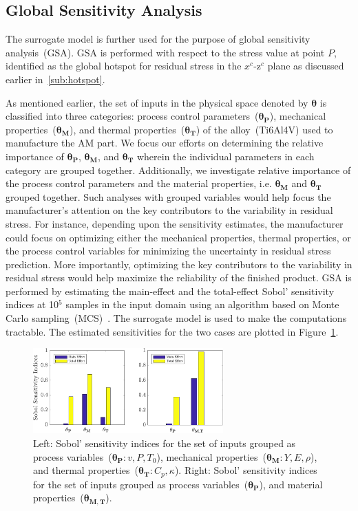 \subsection{Global Sensitivity Analysis}
\label{sub:gsa}

The surrogate model is further used for the purpose of global sensitivity analysis~(GSA). %
GSA is performed with respect to the stress value at point $P$, identified as the global hotspot
for residual stress in the $x^c$-z$^c$ plane as discussed earlier in~\ref{sub:hotspot}. 

As mentioned earlier, the set of inputs in the physical space denoted by $\bm{\theta}$ is classified into three
categories: process control parameters~($\bm{\theta_P}$), mechanical properties~($\bm{\theta_M}$), and
thermal properties~($\bm{\theta_T}$) of the alloy~(Ti6Al4V) used to manufacture the AM part. We focus
our efforts on determining the relative importance of $\bm{\theta_P}$, $\bm{\theta_M}$, and $\bm{\theta_T}$
wherein the individual parameters in each category are grouped together. Additionally, we investigate
relative importance of the process
control parameters and the material properties, i.e. $\bm{\theta_M}$ and $\bm{\theta_T}$ grouped together.
Such analyses with grouped variables would help focus the manufacturer's attention on the key
contributors to the variability in residual stress. For instance, depending upon the sensitivity estimates, the
manufacturer could focus on optimizing either the mechanical properties, thermal properties, or
the process control variables for minimizing the uncertainty in residual stress prediction. 
More importantly, optimizing the key contributors to the variability in residual stress would help maximize the reliability
of the finished product. 
 GSA is performed by estimating the main-effect and the total-effect Sobol' sensitivity
indices at 10$^5$ samples in the input domain using an algorithm based on 
Monte Carlo sampling~(MCS)~\cite{Sobol:2001}. The 
surrogate model is used to make the computations tractable. The estimated sensitivities for the two cases
are plotted in Figure~\ref{fig:gsa}.
%
\begin{figure}[htbp]
\begin{center}
\includegraphics[width=0.65\textwidth]{./Figures/grouped_GSA}
\end{center}
\caption{Left: Sobol' sensitivity indices for the set of inputs grouped as process variables~($\bm{\theta_P}:v,P,T_0$), 
mechanical properties~($\bm{\theta_M}:Y,E,\rho$), and thermal properties~($\bm{\theta_T}:C_p,\kappa$).
Right: Sobol' sensitivity indices for the set of inputs grouped as process variables~($\bm{\theta_P}$), and material 
properties~($\bm{\theta_{M,T}}$).}
\label{fig:gsa}
\end{figure}
